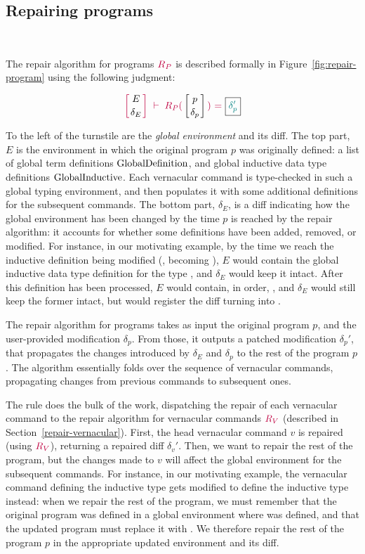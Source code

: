 \subsection{Repairing programs}~\label{repair-program}

The repair algorithm for programs $\textcolor{purple}{R_{P}}$ is described formally in
Figure~\ref{fig:repair-program} using the following judgment:

{
  \[
    {\turnstile
      {\denv{E}{\delta_E}}
      {\repairProg{p}{\delta_p}{\delta_p'}}
    }
  \]
}

\noindent To the left of the turnstile are the \textit{global environment} and
its diff.  The top part, $E$ is the environment in which the original program
$p$ was originally defined: a list of global term definitions
$\text{GlobalDefinition}$, and global inductive data type definitions
$\text{GlobalInductive}$.  Each vernacular command is type-checked in such a
global typing environment, and then populates it with some additional
definitions for the subsequent commands.  The bottom part, $\delta_E$, is a diff
indicating how the global environment has been changed by the time $p$ is
reached by the repair algorithm: it accounts for whether some definitions have
been added, removed, or modified.  For instance, in our motivating example, by
the time we reach the inductive definition being modified (,
becoming ), $E$ would contain the global inductive data type
definition for the type , and $\delta_E$ would keep it intact.
After this definition has been processed, $E$ would contain, in order,
 , and $\delta_E$ would still keep the former
intact, but would register the diff turning  into
.

The repair algorithm for programs takes as input the original program $p$, and
the user-provided modification $\delta_p$.  From those, it outputs a patched
modification $\delta_p'$, that propagates the changes introduced by $\delta_E$
and $\delta_p$ to the rest of the program $p$.  The algorithm essentially folds
over the sequence of vernacular commands, propagating changes from previous
commands to subsequent ones.

The rule  does the bulk of the work, dispatching the repair
of each vernacular command to the repair algorithm for vernacular commands
$\textcolor{purple}{R_{V}}$ (described in Section~\ref{repair-vernacular}).  First, the
head vernacular command $v$ is repaired (using $\textcolor{purple}{R_{V}}$), returning a
repaired diff $\delta_v'$.  Then, we want to repair the rest of the program, but
the changes made to $v$ will affect the global environment for the subsequent
commands.  For instance, in our motivating example, the vernacular command
defining the inductive type  gets modified to define the
inductive type  instead: when we repair the rest of the program,
we must remember that the original program was defined in a global environment
where  was defined, and that the updated program must replace it
with .  We therefore repair the rest of the program $p$ in the
appropriate updated environment and its diff.

